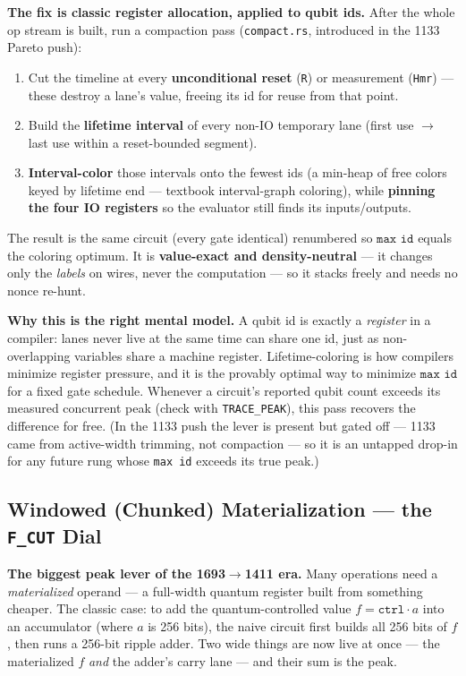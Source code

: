 \documentclass[11pt,a4paper]{article}
\begin{document}
\textbf{The fix is classic register allocation, applied to qubit ids.} After the whole op stream is
built, run a compaction pass (\lstinline{compact.rs}, introduced in the 1133 Pareto push):
\begin{enumerate}
  \item Cut the timeline at every \textbf{unconditional reset} (\texttt{R}) or measurement
    (\texttt{Hmr}) --- these destroy a lane's value, freeing its id for reuse from that point.
  \item Build the \textbf{lifetime interval} of every non-IO temporary lane (first use $\to$ last use
    within a reset-bounded segment).
  \item \textbf{Interval-color} those intervals onto the fewest ids (a min-heap of free colors keyed
    by lifetime end --- textbook interval-graph coloring), while \textbf{pinning the four IO
    registers} so the evaluator still finds its inputs/outputs.
\end{enumerate}

The result is the same circuit (every gate identical) renumbered so $\texttt{max id}$ equals the
coloring optimum. It is \textbf{value-exact and density-neutral} --- it changes only the \emph{labels}
on wires, never the computation --- so it stacks freely and needs no nonce re-hunt.

\textbf{Why this is the right mental model.} A qubit id is exactly a \emph{register} in a compiler:
lanes never live at the same time can share one id, just as non-overlapping variables share a machine
register. Lifetime-coloring is how compilers minimize register pressure, and it is the provably
optimal way to minimize $\texttt{max id}$ for a fixed gate schedule. Whenever a circuit's reported
qubit count exceeds its measured concurrent peak (check with \texttt{TRACE\_PEAK}), this pass recovers
the difference for free. (In the 1133 push the lever is present but gated off --- 1133 came from
active-width trimming, not compaction --- so it is an untapped drop-in for any future rung whose
\texttt{max id} exceeds its true peak.)

\subsection{Windowed (Chunked) Materialization --- the \texttt{F\_CUT} Dial}
\label{sec:windowed}

\textbf{The biggest peak lever of the 1693$\to$1411 era.} Many operations need a \emph{materialized}
operand --- a full-width quantum register built from something cheaper. The classic case: to add the
quantum-controlled value $f = \texttt{ctrl}\cdot a$ into an accumulator (where $a$ is 256 bits), the
naive circuit first builds all 256 bits of $f$, then runs a 256-bit ripple adder. Two wide things are
now live at once --- the materialized $f$ \emph{and} the adder's carry lane --- and their sum is the
peak.
\end{document}

